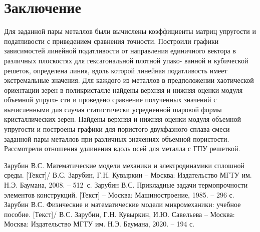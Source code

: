 \documentclass[12pt,a4paper]{article}
\begin{document}
    \section{Заключение}

    Для заданной пары металлов были вычислены коэффициенты матриц упругости и податливости с приведением сравнения точности. Построили графики зависимостей линейной податливости от направления единичного вектора в различных плоскостях для гексагональной плотной упако- ванной и кубической решеток, определена линия, вдоль которой линейная податливость имеет экстремальные значения. Для каждого из металлов в предположении хаотической ориентации зерен в поликристалле найдены верхняя и нижняя оценки модуля объемной упруго- сти и проведено сравнение полученных значений с вычисленными для случая статистически усредненной шаровой формы кристаллических зерен. Найдены верхняя и нижняя оценки модуля объемной упругости и построены графики для пористого двухфазного сплава-смеси заданной пары металлов при различных значениях объемной пористости. Рассмотрели отношения удлинения вдоль осей для металла с ГПУ решеткой.

\begin{thebibliography}{6}
	Зарубин В.С. Математические модели механики и электродинамики сплошной среды. [Текст]/ В.С. Зарубин, Г.Н. Кувыркин -- Москва: Издательство МГТУ им. Н.Э. Баумана, 2008. -- 512~с.
 Зарубин В.С. Прикладные задачи термопрочности элементов конструкций. [Текст] -- Москва: Машиностроение, 1985. -- 296 с.  
 Зарубин В.С. Физические и математические модели микромеханики: учебное пособие. [Текст]/ В.С. Зарубин, Г.Н. Кувыркин, И.Ю. Савельева -- Москва: Москва: Издательство МГТУ им. Н.Э. Баумана, 2020. -- 194 с.
\end{thebibliography}
\end{document}
